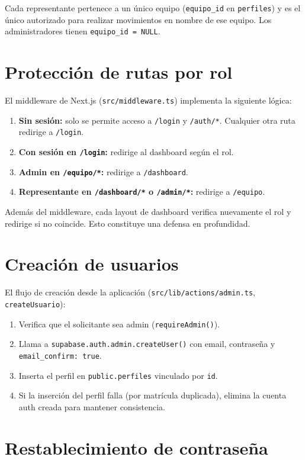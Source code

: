 \documentclass[12pt,a4paper,oneside]{report}
\newcommand{\file}[1]{\texttt{\color{cecyteDark}#1}}
\begin{document}
Cada representante pertenece a un único equipo (\file{equipo\_id} en \file{perfiles}) y es el único autorizado para realizar movimientos en nombre de ese equipo. Los administradores tienen \file{equipo\_id = NULL}.

\section{Protección de rutas por rol}

El middleware de Next.js (\file{src/middleware.ts}) implementa la siguiente lógica:

\begin{enumerate}
  \item \textbf{Sin sesión:} solo se permite acceso a \file{/login} y \file{/auth/*}. Cualquier otra ruta redirige a \file{/login}.
  \item \textbf{Con sesión en \file{/login}:} redirige al dashboard según el rol.
  \item \textbf{Admin en \file{/equipo/*}:} redirige a \file{/dashboard}.
  \item \textbf{Representante en \file{/dashboard/*} o \file{/admin/*}:} redirige a \file{/equipo}.
\end{enumerate}

Además del middleware, cada layout de dashboard verifica nuevamente el rol y redirige si no coincide. Esto constituye una defensa en profundidad.

\section{Creación de usuarios}

El flujo de creación desde la aplicación (\file{src/lib/actions/admin.ts}, \file{createUsuario}):

\begin{enumerate}
  \item Verifica que el solicitante sea admin (\file{requireAdmin()}).
  \item Llama a \file{supabase.auth.admin.createUser()} con email, contraseña y \file{email\_confirm: true}.
  \item Inserta el perfil en \file{public.perfiles} vinculado por \file{id}.
  \item Si la inserción del perfil falla (por matrícula duplicada), elimina la cuenta auth creada para mantener consistencia.
\end{enumerate}

\section{Restablecimiento de contraseña}
\end{document}
